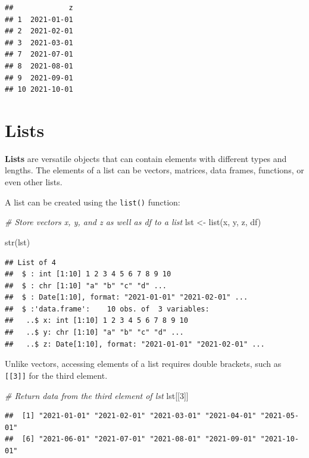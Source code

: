 \documentclass[
]{book}
\newenvironment{Shaded}{\begin{snugshade}}{\end{snugshade}}
\newcommand{\CommentTok}[1]{\textcolor[rgb]{0.56,0.35,0.01}{\textit{#1}}}
\newcommand{\DecValTok}[1]{\textcolor[rgb]{0.00,0.00,0.81}{#1}}
\newcommand{\FunctionTok}[1]{\textcolor[rgb]{0.00,0.00,0.00}{#1}}
\newcommand{\NormalTok}[1]{#1}
\newcommand{\OtherTok}[1]{\textcolor[rgb]{0.56,0.35,0.01}{#1}}
\begin{document}
\begin{verbatim}
##             z
## 1  2021-01-01
## 2  2021-02-01
## 3  2021-03-01
## 7  2021-07-01
## 8  2021-08-01
## 9  2021-09-01
## 10 2021-10-01
\end{verbatim}

\hypertarget{lists}{%
\section{Lists}\label{lists}}

\textbf{Lists} are versatile objects that can contain elements with different types and lengths. The elements of a list can be vectors, matrices, data frames, functions, or even other lists.

A list can be created using the \texttt{list()} function:

\begin{Shaded}
\begin{Highlighting}[]
\CommentTok{\# Store vectors x, y, and z as well as df to a list}
\NormalTok{lst }\OtherTok{\textless{}{-}} \FunctionTok{list}\NormalTok{(x, y, z, df)}

\FunctionTok{str}\NormalTok{(lst)}
\end{Highlighting}
\end{Shaded}

\begin{verbatim}
## List of 4
##  $ : int [1:10] 1 2 3 4 5 6 7 8 9 10
##  $ : chr [1:10] "a" "b" "c" "d" ...
##  $ : Date[1:10], format: "2021-01-01" "2021-02-01" ...
##  $ :'data.frame':    10 obs. of  3 variables:
##   ..$ x: int [1:10] 1 2 3 4 5 6 7 8 9 10
##   ..$ y: chr [1:10] "a" "b" "c" "d" ...
##   ..$ z: Date[1:10], format: "2021-01-01" "2021-02-01" ...
\end{verbatim}

Unlike vectors, accessing elements of a list requires double brackets, such as \texttt{{[}{[}3{]}{]}} for the third element.

\begin{Shaded}
\begin{Highlighting}[]
\CommentTok{\# Return data from the third element of lst}
\NormalTok{lst[[}\DecValTok{3}\NormalTok{]]}
\end{Highlighting}
\end{Shaded}

\begin{verbatim}
##  [1] "2021-01-01" "2021-02-01" "2021-03-01" "2021-04-01" "2021-05-01"
##  [6] "2021-06-01" "2021-07-01" "2021-08-01" "2021-09-01" "2021-10-01"
\end{verbatim}
\end{document}
